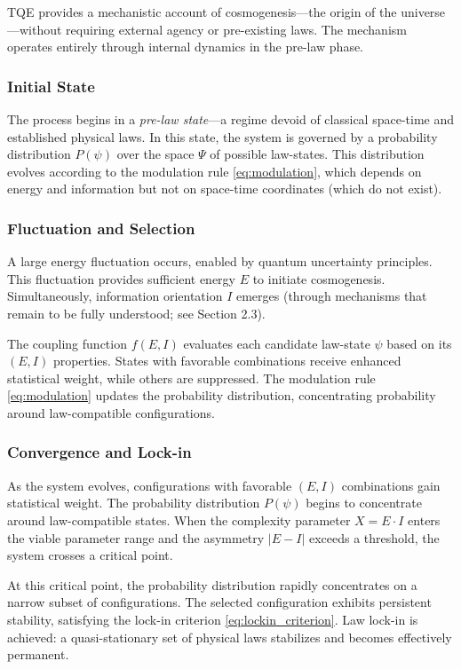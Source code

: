 \documentclass[12pt,a4paper]{article}
\theoremstyle{definition}
\theoremstyle{remark}
\begin{document}
TQE provides a mechanistic account of cosmogenesis—the origin of the universe—without requiring external agency or pre-existing laws. The mechanism operates entirely through internal dynamics in the pre-law phase.

\subsubsection{Initial State}

The process begins in a \emph{pre-law state}—a regime devoid of classical space-time and established physical laws. In this state, the system is governed by a probability distribution $P(\psi)$ over the space $\Psi$ of possible law-states. This distribution evolves according to the modulation rule \eqref{eq:modulation}, which depends on energy and information but not on space-time coordinates (which do not exist).

\subsubsection{Fluctuation and Selection}

A large energy fluctuation occurs, enabled by quantum uncertainty principles. This fluctuation provides sufficient energy $E$ to initiate cosmogenesis. Simultaneously, information orientation $I$ emerges (through mechanisms that remain to be fully understood; see Section 2.3).

The coupling function $f(E,I)$ evaluates each candidate law-state $\psi$ based on its $(E, I)$ properties. States with favorable combinations receive enhanced statistical weight, while others are suppressed. The modulation rule \eqref{eq:modulation} updates the probability distribution, concentrating probability around law-compatible configurations.

\subsubsection{Convergence and Lock-in}

As the system evolves, configurations with favorable $(E, I)$ combinations gain statistical weight. The probability distribution $P(\psi)$ begins to concentrate around law-compatible states. When the complexity parameter $X = E \cdot I$ enters the viable parameter range and the asymmetry $|E - I|$ exceeds a threshold, the system crosses a critical point.

At this critical point, the probability distribution rapidly concentrates on a narrow subset of configurations. The selected configuration exhibits persistent stability, satisfying the lock-in criterion \eqref{eq:lockin_criterion}. Law lock-in is achieved: a quasi-stationary set of physical laws stabilizes and becomes effectively permanent.
\end{document}
